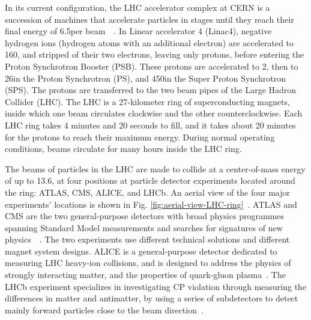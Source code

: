 In its current configuration, the LHC accelerator complex at CERN is a succession of machines that accelerate particles in stages until they reach their final energy of 6.5\TeV per beam~\cite{CERN-OPEN-2000-148}~\cite{Linac4-design-report-2020}. In Linear accelerator 4 (Linac4), negative hydrogen ions (hydrogen atoms with an additional electron) are accelerated to 160\MeV, and stripped of their two electrons, leaving only protons, before entering the Proton Synchrotron Booster (PSB). These protons are accelerated to 2\GeV, then to 26\GeV in the Proton Synchrotron (PS), and 450\GeV in the Super Proton Synchrotron (SPS). The protons are transferred to the two beam pipes of the Large Hadron Collider (LHC). The LHC is a 27-kilometer ring of superconducting magnets, inside which one beam circulates clockwise and the other counterclockwise. Each LHC ring takes 4 minutes and 20 seconds to fill, and it takes about 20 minutes for the protons to reach their maximum energy. During normal operating conditions, beams circulate for many hours inside the LHC ring. 

The beams of particles in the LHC are made to collide at a center-of-mass energy of up to 13.6\TeV, at four positions at particle detector experiments located around the ring: ATLAS, CMS, ALICE, and LHCb. An aerial view of the four major experiments' locations is shown in Fig. \ref{fig:aerial-view-LHC-ring}~\cite{OPEN-PHO-ACCEL-2017-005}. ATLAS and CMS are the two general-purpose detectors with broad physics programmes spanning Standard Model measurements and searches for signatures of new physics~\cite{ATLAS-TDR-14}~\cite{CERN-LHCC-2006-001}. The two experiments use different technical solutions and different magnet system designs. ALICE is a general-purpose detector dedicated to measuring LHC heavy-ion collisions, and is designed to address the physics of strongly interacting matter, and the properties of quark-gluon plasma~\cite{ALICE-original-TDR}. The LHCb experiment specializes in investigating CP violation through measuring the differences in matter and antimatter, by using a series of subdetectors to detect mainly forward particles close to the beam direction~\cite{LHCb-1998}. 

